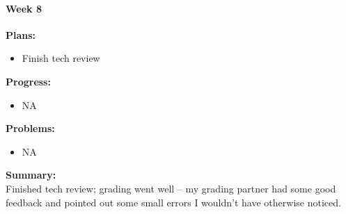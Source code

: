 \paragraph{Week 8}
\begin{adjustwidth}{2.5em}{0pt}
    \vspace{-0.5cm}\textbf{Plans:}
    \vspace{-0.5cm}
    \begin{itemize}
        \item Finish tech review
    \end{itemize} 
    \vspace{-0.3cm}\textbf{Progress:}
    \vspace{-0.5cm}
    \begin{itemize}
        \item NA
    \end{itemize} 
    \vspace{-0.3cm}\textbf{Problems:}
    \vspace{-0.5cm}
    \begin{itemize}
        \item NA
    \end{itemize}  
    \vspace{-0.3cm}\noindent\textbf{Summary:}\\
    \noindent 
    Finished tech review; grading went well -- my grading partner had some good feedback and pointed out some small errors I wouldn't have otherwise noticed.

\end{adjustwidth} 

